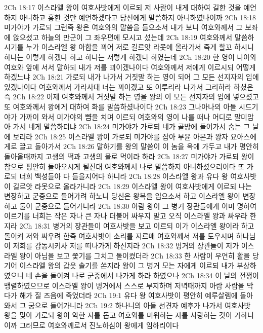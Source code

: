 2Ch 18:17  이스라엘 왕이 여호사밧에게 이르되 저 사람이 내게 대하여 길한 것을 예언하지 아니하고 흉한 것만 예언하겠다고 당신에게 말씀하지 아니하였나이까
2Ch 18:18  미가야가 가로되 그런즉 왕은 여호와의 말씀을 들으소서 내가 보니 여호와께서 그 보좌에 앉으셨고 하늘의 만군이 그 좌우편에 모시고 섰는데
2Ch 18:19  여호와께서 말씀하시기를 누가 이스라엘 왕 아합을 꾀어 저로 길르앗 라못에 올라가서 죽게 할꼬 하시니 하나는 이렇게 하겠다 하고 하나는 저렇게 하겠다 하였는데
2Ch 18:20  한 영이 나아와 여호와 앞에 서서 말하되 내가 저를 꾀이겠나이다 여호와께서 저에게 이르시되 어떻게 하겠느냐
2Ch 18:21  가로되 내가 나가서 거짓말 하는 영이 되어 그 모든 선지자의 입에 있겠나이다 여호와께서 가라사대 너는 꾀이겠고 또 이루리라 나가서 그리하라 하셨은즉
2Ch 18:22  이제 여호와께서 거짓말 하는 영을 왕의 이 모든 선지자의 입에 넣으셨고 또 여호와께서 왕에게 대하여 화를 말씀하셨나이다
2Ch 18:23  그나아나의 아들 시드기야가 가까이 와서 미가야의 뺨을 치며 이르되 여호와의 영이 나를 떠나 어디로 말미암아 가서 네게 말씀하더냐
2Ch 18:24  미가야가 가로되 네가 골방에 들어가서 숨는 그 날에 보리라
2Ch 18:25  이스라엘 왕이 가로되 미가야를 잡아 부윤 아몬과 왕자 요아스에게로 끌고 돌아가서
2Ch 18:26  말하기를 왕의 말씀이 이 놈을 옥에 가두고 내가 평안히 돌아올때까지 고생의 떡과 고생의 물로 먹이라 하라
2Ch 18:27  미가야가 가로되 왕이 참으로 평안히 돌아오시게 될진대 여호와께서 나로 말씀하지 아니하셨으리이다 또 가로되 너희 백성들아 다 들을지어다 하니라
2Ch 18:28  이스라엘 왕과 유다 왕 여호사밧이 길르앗 라못으로 올라가니라
2Ch 18:29  이스라엘 왕이 여호사밧에게 이르되 나는 변장하고 군중으로 들어가려 하노니 당신은 왕복을 입으소서 하고 이스라엘 왕이 변장하고 둘이 군중으로 들어가니라
2Ch 18:30  아람 왕이 그 병거 장관들에게 이미 명하여 이르기를 너희는 작은 자나 큰 자나 더불어 싸우지 말고 오직 이스라엘 왕과 싸우라 한지라
2Ch 18:31  병거의 장관들이 여호사밧을 보고 이르되 이가 이스라엘 왕이라 하고 돌이켜 저와 싸우려 한즉 여호사밧이 소리를 지르매 여호와께서 저를 도우시며 하나님이 저희를 감동시키사 저를 떠나가게 하신지라
2Ch 18:32  병거의 장관들이 저가 이스라엘 왕이 아님을 보고 쫓기를 그치고 돌이켰더라
2Ch 18:33  한 사람이 우연히 활을 당기어 이스라엘 왕의 갑옷 솔기를 쏜지라 왕이 그 병거 모는 자에게 이르되 내가 부상하였으니 네 손을 돌이켜 나로 군중에서 나가게 하라 하였으나
2Ch 18:34  이 날의 전쟁이 맹렬하였으므로 이스라엘 왕이 병거에서 스스로 부지하며 저녁때까지 아람 사람을 막다가 해가 질 즈음에 죽었더라
2Ch 19:1  유다 왕 여호사밧이 평안히 예루살렘에 돌아와서 그 궁으로 들어가니라
2Ch 19:2  하나니의 아들 선견자 예후가 나가서 여호사밧 왕을 맞아 가로되 왕이 악한 자를 돕고 여호와를 미워하는 자를 사랑하는 것이 가하니이까 그러므로 여호와께로서 진노하심이 왕에게 임하리이다
